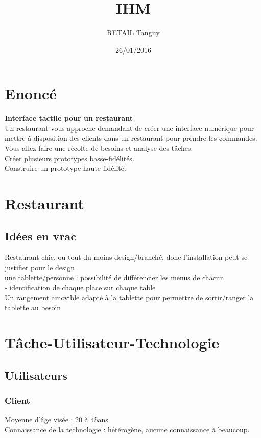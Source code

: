 \documentclass[11pt]{article}
\title{\textbf{IHM \\}}
\author{RETAIL Tanguy}
\date{26/01/2016}
\begin{document}
\maketitle
\tableofcontents
\newpage


\section{Enoncé}
\textbf{Interface tactile pour un restaurant}\\
Un restaurant vous approche demandant de créer une interface numérique pour mettre à disposition des clients dans un restaurant pour prendre les commandes.\\
Vous allez faire une récolte de besoins et analyse des tâches.\\
Créer plusieurs prototypes basse-fidélités.\\
Construire un prototype haute-fidélité.\\

\section{Restaurant}
\subsection{Idées en vrac}
Restaurant chic, ou tout du moins design/branché, donc l'installation peut se justifier pour le design\\
une tablette/personne : possibilité de différencier les menus de chacun\\
- identification de chaque place sur chaque table\\
Un rangement amovible adapté à la tablette pour permettre de sortir/ranger la tablette au besoin\\
\section{Tâche-Utilisateur-Technologie}
\subsection{Utilisateurs}
\subsubsection{Client}
Moyenne d'âge visée : 20 à 45ans \\
Connaissance de la technologie : hétérogène, aucune connaissance à beaucoup.\\
\end{document}
